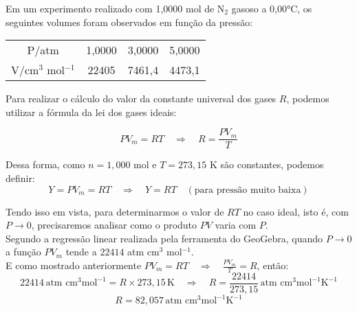 \begin{xcs}
    Em um experimento realizado com 1,0000 mol de N\(_2\) gasoso a 0,00°C, os
    seguintes volumes foram observados em função da pressão: 
    \begin{center}
    \begin{tabular}{c | c c c}
    \hline
        P/atm & 1,0000 & 3,0000 & 5,0000\\
        V/cm\(^3\) mol\(^{-1}\) & 22405 & 7461,4 & 4473,1\\
    \hline
    \end{tabular}
    \end{center}
\end{xcs}
\begin{rsl}
    
    Para realizar o cálculo do valor da constante universal dos gases \( R \), podemos utilizar a fórmula da lei dos gases ideais: 
    
    \[ PV_m = RT \quad \Rightarrow \quad R = \frac{PV_m}{T} \]
    
    Dessa forma, como \( n = 1,000 \) mol e \( T = 273,15 \) K são constantes, podemos definir:
    \[Y = PV_m = RT \quad \Rightarrow \quad Y = RT \quad (\text{para pressão muito baixa})\]
    
    Tendo isso em vista, para determinarmos o valor de \( RT \) no caso ideal, 
    isto é, com \( P \to 0 \), precisaremos analisar como o produto \( PV \) varia com \( P \). \\
    
    Segundo a regressão linear realizada pela ferramenta do GeoGebra, quando \( P \to 0 \) a função \( PV_m \) tende a \( 22414 \) atm cm\(^3\) mol\(^{-1}\). \\
    
    E como mostrado anteriormente \( PV_m = RT \quad \Rightarrow \quad \frac{PV_m}{T} = R \), então:
    \[22414 \, \text{atm cm}^3 \text{mol}^{-1} = R \times 273,15 \, \text{K} \quad \Rightarrow \quad R = \frac{22414}{273,15} \, \text{atm cm}^3 \text{mol}^{-1} \text{K}^{-1}\]
    \[R = 82,057 \, \text{atm cm}^3 \text{mol}^{-1} \text{K}^{-1}\]
    
\end{rsl}
